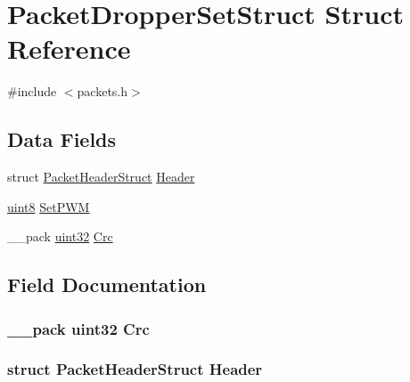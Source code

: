 \hypertarget{struct_packet_dropper_set_struct}{}\section{Packet\+Dropper\+Set\+Struct Struct Reference}
\label{struct_packet_dropper_set_struct}


{\ttfamily \#include $<$packets.\+h$>$}

\subsection*{Data Fields}
\begin{DoxyCompactItemize}
\item 
struct \hyperlink{struct_packet_header_struct}{Packet\+Header\+Struct} \hyperlink{struct_packet_dropper_set_struct_ab201af50281aff5ed4f984f994938007}{Header}
\item 
\hyperlink{_h_y_d_r_a_s_8_x_2types_8h_a33a5e996e7a90acefb8b1c0bea47e365}{uint8} \hyperlink{struct_packet_dropper_set_struct_a5cf541f026d00020994dee26f3d9f8d1}{Set\+P\+W\+M}
\item 
\+\_\+\+\_\+pack \hyperlink{_h_y_d_r_a_s_8_x_2types_8h_acbd4acd0d29e2d6c43104827f77d9cd2}{uint32} \hyperlink{struct_packet_dropper_set_struct_a9ac0191cb1217dfb4164ca0e333de3ac}{Crc}
\end{DoxyCompactItemize}


\subsection{Field Documentation}
\hypertarget{struct_packet_dropper_set_struct_a9ac0191cb1217dfb4164ca0e333de3ac}{}
\subsubsection[{Crc}]{\setlength{\rightskip}{0pt plus 5cm}\+\_\+\+\_\+pack {\bf uint32} Crc}\label{struct_packet_dropper_set_struct_a9ac0191cb1217dfb4164ca0e333de3ac}
\hypertarget{struct_packet_dropper_set_struct_ab201af50281aff5ed4f984f994938007}{}
\subsubsection[{Header}]{\setlength{\rightskip}{0pt plus 5cm}struct {\bf Packet\+Header\+Struct} Header}\label{struct_packet_dropper_set_struct_ab201af50281aff5ed4f984f994938007}
\hypertarget{struct_packet_dropper_set_struct_a5cf541f026d00020994dee26f3d9f8d1}{}
